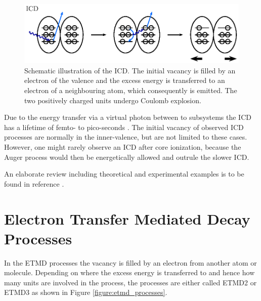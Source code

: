 \begin{figure}[h]
 \centering
 \includegraphics{pics/icd-pspic.eps}
 \caption{Schematic illustration of the \ac{ICD}. The initial vacancy is filled
          by an electron of the valence and the excess energy is transferred to
          an electron of a neighbouring atom, which consequently is emitted.
          The two positively charged units undergo Coulomb explosion.}
 \label{figure:icd_process}
\end{figure}


Due to the energy transfer via a virtual photon between to subsystems
the ICD has a lifetime of femto- to pico-seconds \cite{Zobeley98,Santra01_1,
Zobeley01,Santra01_3,Averbukh04,Averbukh05}.
The initial vacancy of observed ICD processes are normally in the inner-valence,
but are not limited to these cases. However, one might rarely observe
an ICD after core ionization, because the Auger process would then be energetically
allowed and outrule the slower ICD.

An elaborate review including theoretical and experimental examples is to be
found in reference \cite{Hergenhahn11}.


\section{Electron Transfer Mediated Decay Processes}
In the \ac{ETMD} processes the vacancy is filled by an electron from another
atom or molecule. Depending on where
the excess energy is transferred to and
hence how many units are involved in the process, the processes are either called
ETMD2 or ETMD3 as shown in Figure \ref{figure:etmd_processes}.

